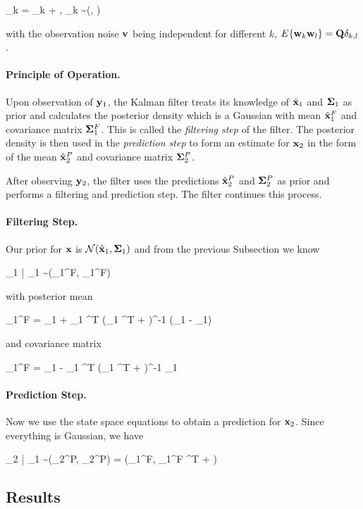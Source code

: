 \bee
\ybf_k = \Gbf \xbf_k + \vbf, \quad \vbf_k \sim \Nc(\zerobf, \Rbf)
\eee

with the observation noise $\mathbf{v}$ being independent for different $k$, $E\{\mathbf{w}_k \mathbf{w}_l\} = \mathbf{Q} \delta_{k,l}$.

\paragraph{Principle of Operation.} Upon observation of $\mathbf{y}_1$, the Kalman filter treats its knowledge of $\hat {\mathbf{x}}_1$ and $\mathbf{\Sigma}_1$ as prior and calculates the posterior density which is a Gaussian with mean $\hat{\mathbf{x}}_1^F$ and covariance matrix $\mathbf{\Sigma}_1^F$. This is called the \emph{filtering step} of the filter. The posterior density is then used in the \emph{prediction step} to form an estimate for $\mathbf{x}_2$ in the form of the mean $\hat{\mathbf{x}}_2^P$ and covariance matrix $\mathbf{\Sigma}_2^P$.

After observing $\mathbf{y}_2$, the filter uses the predictions $\hat{\mathbf{x}}_2^P$ and $\mathbf{\Sigma}_2^P$ as prior and performs a filtering and prediction step. The filter continues this process.

\paragraph{Filtering Step.} Our prior for $\mathbf{x}$ is $\mathcal{N}(\hat{\mathbf{x}}_1, \mathbf{\Sigma}_1)$ and from the previous Subsection we know

\bee
\xbf_1 | \ybf_1 \sim \Nc(\xbf_1^F, \Sigmabf_1^F)
\eee

with posterior mean

\bee
\xbf_1^F = \hat\xbf_1 + \Sigmabf_1 \Gbf^T (\Gbf \Sigmabf_1 \Gbf^T + \Rbf)^{-1} (\ybf_1 - \Gbf \hat\xbf_1)
\eee

and covariance matrix

\bee
\Sigmabf_1^F = \Sigmabf_1 - \Sigmabf_1 \Gbf^T (\Gbf \Sigmabf_1 \Gbf^T + \Rbf)^{-1} \Gbf \Sigmabf_1
\eee

\paragraph{Prediction Step.} Now we use the state space equations to obtain a prediction for $\mathbf{x}_2$. Since everything is Gaussian, we have

\bee
\xbf_2 | \ybf_1 \sim \Nc(\hat\xbf_2^P, \Sigmabf_2^P) = \Nc(\Abf \xbf_1^F, \Abf \Sigmabf_1^F \Abf^T + \Qbf)
\eee


\subsection{Results}

